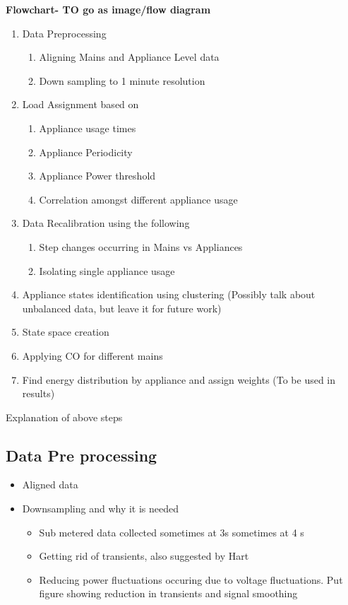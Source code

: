 \documentclass[conference]{IEEEtran}
\begin{document}
\textbf{Flowchart- TO go as image/flow diagram}
\begin{enumerate}
\item Data Preprocessing
\begin{enumerate}
\item Aligning Mains and Appliance Level data
\item Down sampling to 1 minute resolution
\end{enumerate}
\item Load Assignment based on 
\begin{enumerate}

\item Appliance usage times
\item Appliance Periodicity
\item Appliance Power threshold
\item Correlation amongst different appliance usage

\end{enumerate}
\item Data Recalibration using the following
\begin{enumerate}
\item Step changes occurring in Mains vs Appliances
\item Isolating single appliance usage
\end{enumerate}
\item Appliance states identification using clustering (Possibly talk about unbalanced data, but leave it for future work)
\item State space creation
\item Applying CO for different mains
\item Find energy distribution by appliance and assign weights (To be used in results)

\end{enumerate}


Explanation of above steps
\subsection{Data Pre processing}
\begin{itemize}
\item Aligned data
\item Downsampling and why it is needed
\begin{itemize}
\item Sub metered data collected sometimes at 3s sometimes at 4 s
\item Getting rid of transients, also suggested by Hart
\item Reducing power fluctuations occuring due to voltage fluctuations. Put figure showing reduction in transients and signal smoothing
\end{itemize}
\end{itemize}
\end{document}
